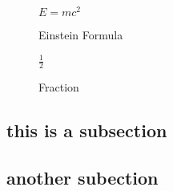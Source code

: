 \begin{figure}[ht]
    \centering
    \begin{math}
        E=mc^2 
    \end{math}
    \caption{Einstein Formula}
    \label{fig:Emc2}

\end{figure}

\begin{figure}[ht]
    \centering
    \begin{math}
        \frac{1}{2} 
    \end{math}
    \caption{Fraction}
    \label{fig:Fraction 1}

\end{figure}

\subsection{this is a subsection}

\lipsum[7-8]

\subsection{another subection}

\lipsum[4-6]
